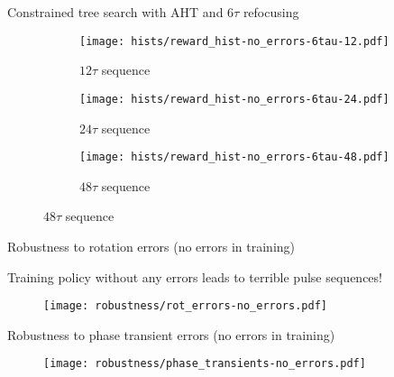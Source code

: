 \documentclass{beamer}
\begin{document}
\begin{frame}{Constrained tree search with AHT and $6\tau$ refocusing}
%
\begin{figure}[H]
    \centering
    \begin{subfigure}{.49\textwidth}
        \centering
        \texttt{[image: hists/reward\_hist-no\_errors-6tau-12.pdf]}
        \caption{$12\tau$ sequence}
        \label{fig:reward_hist-no_errors-6tau-12}
    \end{subfigure}
    \begin{subfigure}{.49\textwidth}
        \centering
        \texttt{[image: hists/reward\_hist-no\_errors-6tau-24.pdf]}
        \caption{$24\tau$ sequence}
        \label{fig:reward_hist-no_errors-6tau-24}
    \end{subfigure}
    \begin{subfigure}{.49\textwidth}
        \centering
        \texttt{[image: hists/reward\_hist-no\_errors-6tau-48.pdf]}
        \caption{$48\tau$ sequence}
        \label{fig:reward_hist-no_errors-6tau-48}
    \end{subfigure}
\end{figure}


\end{frame}

\begin{frame}
{Robustness to rotation errors (no errors in training)}

Training policy without any errors leads to terrible pulse sequences!

\begin{figure}
    \centering
    \texttt{[image: robustness/rot\_errors-no\_errors.pdf]}
\end{figure}


\end{frame}

\begin{frame}{Robustness to phase transient errors  (no errors in training)}

\begin{figure}
    \centering
    \texttt{[image: robustness/phase\_transients-no\_errors.pdf]}
\end{figure}

\end{frame}
\end{document}
